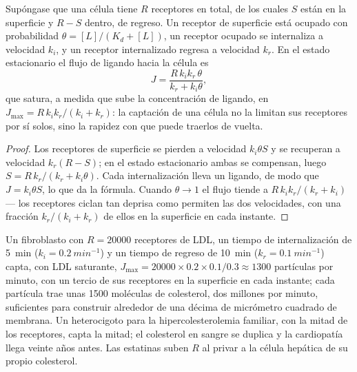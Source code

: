 \begin{proposition}\label{prop:b3:membrane-traffic:uptake}
Supóngase que una célula tiene $R$ receptores en total, de los cuales $S$
están en la superficie y $R - S$ dentro, de regreso. Un receptor de
superficie está ocupado con probabilidad $\theta = [L]/(K_{d} + [L])$, un
receptor ocupado se internaliza a velocidad $k_{i}$, y un receptor
internalizado regresa a velocidad $k_{r}$. En el estado estacionario el
flujo de ligando hacia la célula es
\[
J = \frac{R\,k_{i}k_{r}\,\theta}{k_{r} + k_{i}\theta},
\]
que satura, a medida que sube la concentración de ligando, en $J_{\max} =
R\,k_{i}k_{r}/(k_{i} + k_{r})$: la captación de una célula no la limitan
sus receptores por sí solos, sino la rapidez con que puede traerlos de
vuelta.
\end{proposition}
\begin{proof}
Los receptores de superficie se pierden a velocidad $k_{i}\theta S$ y se
recuperan a velocidad $k_{r}(R - S)$; en el estado estacionario ambas se
compensan, luego $S = R\,k_{r}/(k_{r}
+ k_{i}\theta)$. Cada internalización lleva un ligando, de modo que $J =
k_{i}\theta S$, lo que da la fórmula. Cuando $\theta \to 1$ el flujo
tiende a $R\,k_{i}k_{r}/(k_{r} + k_{i})$ --- los receptores ciclan tan
deprisa como permiten las dos velocidades, con una fracción
$k_{r}/(k_{i} + k_{r})$ de ellos en la superficie en cada instante.
\end{proof}

\begin{example}\label{ex:b3:membrane-traffic:ldl}
Un fibroblasto con $R = \num{20000}$ receptores de LDL, un tiempo de
internalización de \qty{5}{min} ($k_{i} = \qty{0.2}{min^{-1}}$) y un
tiempo de regreso de \qty{10}{min}
($k_{r} = \qty{0.1}{min^{-1}}$) capta, con LDL saturante,
$J_{\max} = \num{20000}\times 0.2\times 0.1/0.3 \approx 1300$ partículas
por minuto, con un tercio de sus receptores en la superficie en cada
instante; cada partícula trae unas \num{1500} moléculas de colesterol,
dos millones por minuto, suficientes para construir alrededor de una
décima de micrómetro cuadrado de membrana. Un heterocigoto para la
hipercolesterolemia familiar, con la mitad de los receptores, capta la
mitad; el colesterol en sangre se duplica y la cardiopatía llega veinte
años antes. Las estatinas suben $R$ al privar a la célula hepática de su
propio colesterol.
\end{example}

